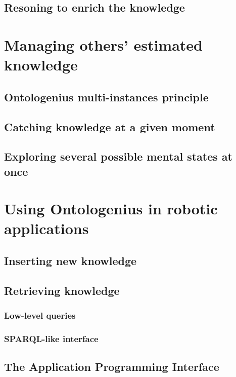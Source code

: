 \subsection{Resoning to enrich the knowledge}



\section{Managing others' estimated knowledge}

\subsection{Ontologenius multi-instances principle}

\subsection{Catching knowledge at a given moment}

\subsection{Exploring several possible mental states at once}



\section{Using Ontologenius in robotic applications}

\subsection{Inserting new knowledge}

\subsection{Retrieving knowledge}

\subsubsection{Low-level queries}

\subsubsection{SPARQL-like interface}

\subsection{The Application Programming Interface}

